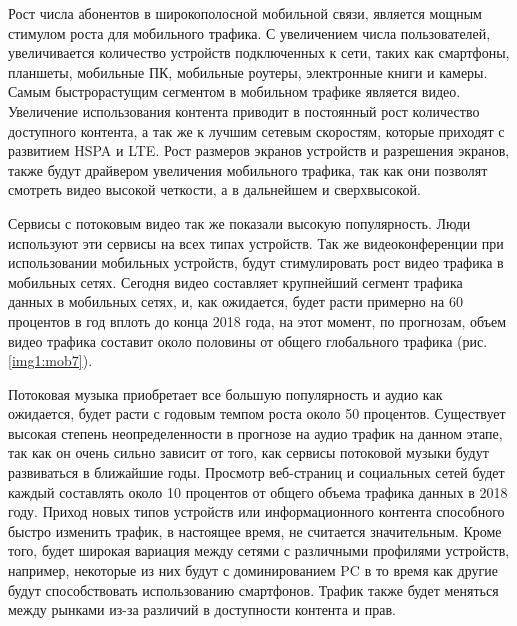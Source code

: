 Рост числа абонентов в широкополосной мобильной связи, является мощным стимулом роста для мобильного трафика. С увеличением числа пользователей, увеличивается количество устройств подключенных к сети, таких как смартфоны, планшеты, мобильные ПК, мобильные роутеры, электронные книги и камеры.  Самым быстрорастущим сегментом в мобильном трафике является видео. Увеличение использования контента приводит в постоянный рост количество доступного контента, а так же к лучшим сетевым скоростям, которые приходят с развитием HSPA и LTE. Рост размеров экранов устройств и разрешения экранов, также будут драйвером увеличения мобильного трафика, так как они позволят смотреть видео высокой четкости, а в дальнейшем и сверхвысокой. 

Сервисы с потоковым видео так же показали высокую популярность. Люди используют эти сервисы на всех типах устройств. Так же видеоконференции при использовании мобильных устройств, будут стимулировать рост видео трафика в мобильных сетях. Сегодня видео составляет крупнейший сегмент трафика данных в мобильных сетях, и, как ожидается, будет расти примерно на 60 процентов в год вплоть до конца 2018 года, на этот момент, по прогнозам, объем видео трафика составит около половины от общего глобального трафика (рис. \ref{img1:mob7}).

Потоковая музыка приобретает все большую популярность и аудио как ожидается, будет расти с годовым темпом роста около 50 процентов. Существует высокая степень неопределенности в прогнозе на аудио трафик на данном этапе, так как он очень сильно зависит от того, как сервисы потоковой музыки будут развиваться в ближайшие годы.
Просмотр веб-страниц и социальных сетей будет каждый составлять около 10 процентов от общего объема трафика данных в 2018 году.
Приход новых типов устройств или информационного контента способного быстро изменить трафик, в настоящее время, не считается значительным. Кроме того, будет широкая вариация между сетями с различными профилями устройств, например, некоторые из них будут с доминированием PC в то время как другие будут способствовать использованию смартфонов. Трафик также будет меняться между рынками из-за различий в доступности контента и прав. 

